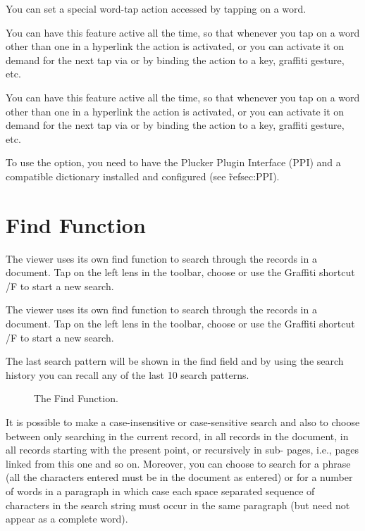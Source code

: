 You can set a special word-tap action accessed by tapping on a word.
\begin{latexonly}
You can have this feature active all the time, so that whenever you
tap on a word other than one in a hyperlink the action is activated,
or you can activate it on demand for the next tap via
 or by binding the 
action to a key, graffiti gesture, etc.
\end{latexonly}
\begin{htmlonly}
You can have this feature active all the time, so that whenever you
tap on a word other than one in a hyperlink the action is activated,
or you can activate it on demand for the next tap via
 or by binding the 
action to a key, graffiti gesture, etc.
\end{htmlonly}

To use the  option, you need to have
the Plucker Plugin Interface (PPI) and a compatible dictionary
installed and configured (see \~ref{sec:PPI}).\\

\section{Find Function}\label{sec:Find}

\begin{latexonly}
The viewer uses its own find function to search through the
records in a document. Tap on the left lens in the toolbar,
choose  or use the Graffiti shortcut /F
to start a new search.
\end{latexonly}
\begin{htmlonly}
The viewer uses its own find function to search through the
records in a document. Tap on the left lens in the toolbar,
choose  or use the Graffiti shortcut /F
to start a new search.
\end{htmlonly}
The last search pattern will be shown in the find field and
by using the search history you can recall any of the last
10 search patterns.\\

\begin{figure} [!htb]
\centerline{}
\caption{\label{fig:Find}The Find Function.}
\end{figure}

It is possible to make a case-insensitive or case-sensitive search and also to
choose between only searching in the current record, in all records in the
document, in all records starting with the present point, or recursively in sub-
pages, i.e., pages linked from this one and so on.  Moreover, you can choose to 
search for a phrase (all the characters entered must be in the document as
entered) or for a number of words in a paragraph in which case each space
separated sequence of characters in the search string must occur in the same
paragraph (but need not appear as a complete word).\\

